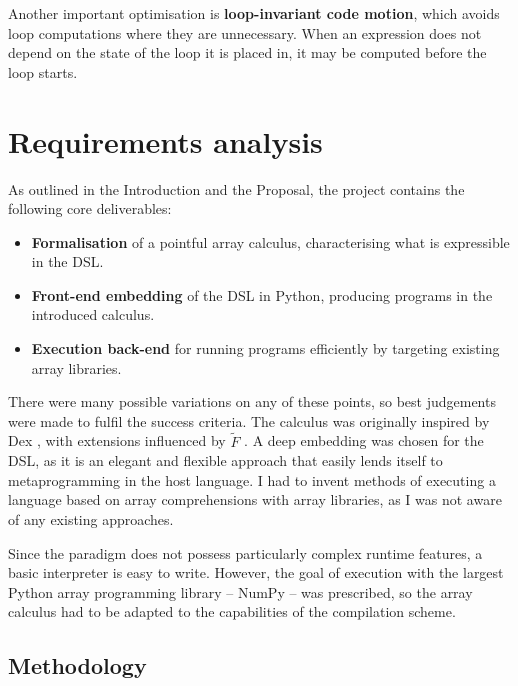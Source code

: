 Another important optimisation is \textbf{loop-invariant code motion}, which avoids loop computations where they are unnecessary. When an expression does not depend on the state of the loop it is placed in, it may be computed before the loop starts.

\section{Requirements analysis}
\label{requirements-analysis}

As outlined in the Introduction and the Proposal, the project contains the following core deliverables:
\begin{itemize}
    \item \textbf{Formalisation} of a pointful array calculus, characterising what is expressible in the DSL.
    \item \textbf{Front-end embedding} of the DSL in Python, producing programs in the introduced calculus.
    \item \textbf{Execution back-end} for running programs efficiently by targeting existing array libraries.
\end{itemize}
There were many possible variations on any of these points, so best judgements were made to fulfil the success criteria. The calculus was originally inspired by Dex \cite{paszke2021getting}, with extensions influenced by $\tilde F$ \cite{shaikhha2019efficient}. A deep embedding was chosen for the DSL, as it is an elegant and flexible approach that easily lends itself to metaprogramming in the host language. 
I had to invent methods of executing a language based on array comprehensions with array libraries, as I was not aware of any existing approaches. 

Since the paradigm does not possess particularly complex runtime features, a basic interpreter is easy to write. However, the goal of execution with the largest Python array programming library -- NumPy -- was prescribed, so the array calculus had to be adapted to the capabilities of the compilation scheme. 

\subsection{Methodology}

